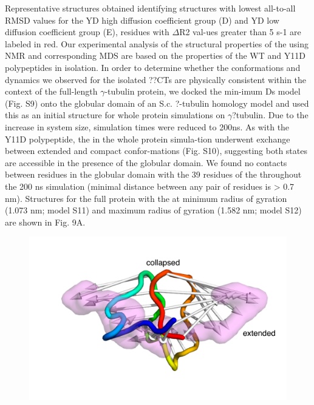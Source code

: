 Representative structures obtained identifying structures with lowest all-to-all RMSD values for the YD high diffusion coefficient group (D) and YD low diffusion coefficient group (E), residues with $\Delta$R2 val-ues greater than 5 s-1 are labeled in red.
	Our experimental analysis of the structural properties of the \gct{} using NMR and corresponding MDS are based on the properties of the WT and Y11D \gct{} polypeptides in isolation. In order to determine whether the conformations and dynamics we observed for the isolated ??CTs are physically consistent within the context of the full-length $\gamma$-tubulin protein, we docked the min-imum Ds \gct{} model (Fig. S9) onto the globular domain of an S.c. ?-tubulin homology model and used this as an initial structure for whole protein simulations on $\gamma$?tubulin. Due to the increase in system size, simulation times were reduced to 200ns.  As with the Y11D \gct{} polypeptide, the \gct{} in the whole protein simula-tion underwent exchange between extended and compact confor-mations (Fig. S10), suggesting both states are accessible in the presence of the globular domain. We found no contacts between residues in the globular domain with the 39 residues of the \gct{} throughout the 200 ns simulation (minimal distance between any pair of residues is > 0.7 nm). Structures for the full protein with the \gct{} at minimum radius of gyration (1.073 nm; model S11) and maximum radius of gyration (1.582 nm; model S12) are shown in Fig. 9A.


\begin{figure}
\includegraphics[scale=0.5]{figures/yd_porcupine.png}
\end{figure}

